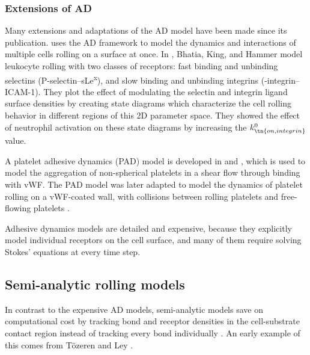 \subsubsection{Extensions of AD}
\label{sec:extensions-ad}

Many extensions and adaptations of the AD model have been made since
its publication. \cite{King2001} uses the AD framework to model the
dynamics and interactions of multiple cells rolling on a surface at
once. In \cite{Bhatia2003}, Bhatia, King, and Hammer model leukocyte
rolling with two classes of receptors: fast binding and unbinding
selectins (P-selectin--sLe\textsuperscript{x}), and slow binding and
unbinding integrins (-integrin--ICAM-1). They plot the effect
of modulating the selectin and integrin ligand surface densities by
creating state diagrams which characterize the cell rolling behavior
in different regions of this 2D parameter space. They showed the
effect of neutrophil activation on these state diagrams by increasing
the $k_\tn{on, integrin}^0$ value.

A platelet adhesive dynamics (PAD) model is developed in
\cite{Mody2008a} and \cite{Mody2008b}, which is used to model the
aggregation of non-spherical platelets in a shear flow through binding
with vWF. The PAD model was later adapted to model the dynamics of
platelet rolling on a vWF-coated wall, with collisions between rolling
platelets and free-flowing platelets \cite{Wang2013}.

Adhesive dynamics models are detailed and expensive, because they
explicitly model individual receptors on the cell surface, and many of
them require solving Stokes' equations at every time step.

\subsection{Semi-analytic rolling models}
\label{sec:semi-analytic}

In contrast to the expensive AD models, semi-analytic models save on
computational cost by tracking bond and receptor densities in the
cell-substrate contact region instead of tracking every bond
individually \cite{Pospieszalska2009}. An early example of this comes
from T\"{o}zeren and Ley \cite{Tozeren1992}. 
